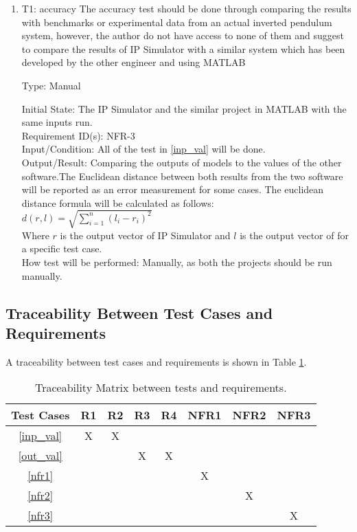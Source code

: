 \documentclass[12pt, titlepage]{article}
\begin{document}
\begin{enumerate}

\item{T1: accuracy}
The accuracy test should be done through comparing the results with benchmarks or experimental data from an actual inverted pendulum system, however, the author do not have access to none of them and suggest to compare the results of IP Simulator with a similar system which has been developed by the other engineer and using MATLAB \cite{al-khazraji_2022} 

Type: Manual
					
Initial State: The IP Simulator and the similar project in MATLAB with the same inputs run.\\
Requirement ID(s): NFR-3\\				
Input/Condition: All of the test in \ref{inp_val} will be done.\\  		
Output/Result: Comparing the outputs of models to the values of the other software.The Euclidean distance between both results from the two software will be reported as an error measurement for some cases. The euclidean distance formula will be calculated as follows:\\
\newline
$d\left( r,l\right)   = \sqrt {\sum _{i=1}^{n}  \left( l_{i}-r_{i}\right)^2 } $ \\
\newline
Where $r$ is the output vector of IP Simulator and $l$ is the output vector of \cite{al-khazraji_2022} for a specific test case. 
\\
How test will be performed: Manually, as both the projects should be run manually.\\

\end{enumerate}

\subsection{Traceability Between Test Cases and Requirements}
A traceability between test cases and requirements is shown in Table \ref{tbl_rel}.


\begin{table} [h!]
\centering
\begin{tabular}{|c|c| c| c| c | c|c | c|}
\hline
Test Cases & R1 & R2 & R3& R4& NFR1& NFR2&NFR3  \\
 \hline   
 \ref{inp_val} &X &X & & &&& \\
 \hline
  \ref{out_val}   & & & X&X & && \\
 \hline
  \ref{nfr1}   && & & &  X&&\\
 \hline
  \ref{nfr2}  &&& & &  &X&\\
 \hline
  \ref{nfr3}  &&& & &  &&X\\
 \hline
\end{tabular}
\caption{\label{tbl_rel}Traceability Matrix between tests and requirements.}
\end{table}
\end{document}
